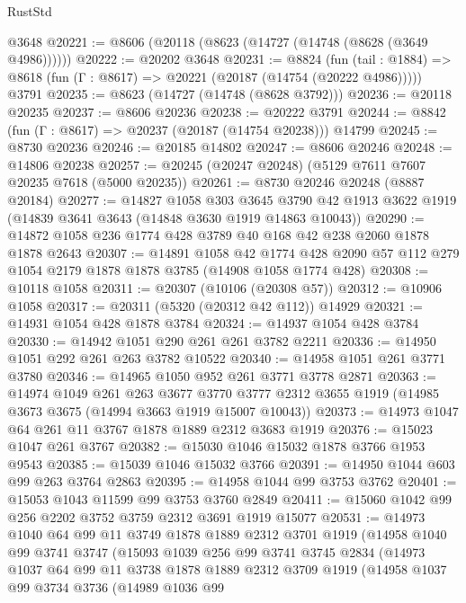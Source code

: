 \begin{lexlean}{RustStd}
\begin{coremodule}
    @3648
@20221 := @8606 (@20118 (@8623 (@14727 (@14748 (@8628 (@3649 @4986))))))
@20222 := @20202 @3648
@20231 := @8824
    (fun (tail : @1884) => @8618 (fun (Γ : @8617) => @20221 (@20187 (@14754 (@20222 @4986)))))
    @3791
@20235 := @8623 (@14727 (@14748 (@8628 @3792)))
@20236 := @20118 @20235
@20237 := @8606 @20236
@20238 := @20222 @3791
@20244 := @8842 (fun (Γ : @8617) => @20237 (@20187 (@14754 @20238))) @14799
@20245 := @8730 @20236
@20246 := @20185 @14802
@20247 := @8606 @20246
@20248 := @14806 @20238
@20257 := @20245 (@20247 @20248) (@5129 @7611 @7607 @20235 @7618 (@5000 @20235))
@20261 := @8730 @20246 @20248 (@8887 @20184)
@20277 := @14827
    @1058
    @303
    @3645
    @3790
    @42
    @1913
    @3622
    @1919
    (@14839 @3641 @3643 (@14848 @3630 @1919 @14863 @10043))
@20290 := @14872 @1058 @236 @1774 @428 @3789 @40 @168 @42 @238 @2060 @1878 @1878 @2643
@20307 := @14891
    @1058
    @42
    @1774
    @428
    @2090
    @57
    @112
    @279
    @1054
    @2179
    @1878
    @1878
    @3785
    (@14908 @1058 @1774 @428)
@20308 := @10118 @1058
@20311 := @20307 (@10106 (@20308 @57))
@20312 := @10906 @1058
@20317 := @20311 (@5320 (@20312 @42 @112)) @14929
@20321 := @14931 @1054 @428 @1878 @3784
@20324 := @14937 @1054 @428 @3784
@20330 := @14942 @1051 @290 @261 @261 @3782 @2211
@20336 := @14950 @1051 @292 @261 @263 @3782 @10522
@20340 := @14958 @1051 @261 @3771 @3780
@20346 := @14965 @1050 @952 @261 @3771 @3778 @2871
@20363 := @14974
    @1049
    @261
    @263
    @3677
    @3770
    @3777
    @2312
    @3655
    @1919
    (@14985 @3673 @3675 (@14994 @3663 @1919 @15007 @10043))
@20373 := @14973 @1047 @64 @261 @11 @3767 @1878 @1889 @2312 @3683 @1919
@20376 := @15023 @1047 @261 @3767
@20382 := @15030 @1046 @15032 @1878 @3766 @1953 @9543
@20385 := @15039 @1046 @15032 @3766
@20391 := @14950 @1044 @603 @99 @263 @3764 @2863
@20395 := @14958 @1044 @99 @3753 @3762
@20401 := @15053 @1043 @11599 @99 @3753 @3760 @2849
@20411 := @15060 @1042 @99 @256 @2202 @3752 @3759 @2312 @3691 @1919 @15077
@20531 := @14973
    @1040
    @64
    @99
    @11
    @3749
    @1878
    @1889
    @2312
    @3701
    @1919
    (@14958
      @1040
      @99
      @3741
      @3747
      (@15093
        @1039
        @256
        @99
        @3741
        @3745
        @2834
        (@14973
          @1037
          @64
          @99
          @11
          @3738
          @1878
          @1889
          @2312
          @3709
          @1919
          (@14958
            @1037
            @99
            @3734
            @3736
            (@14989
              @1036
              @99

\end{coremodule}
\end{lexlean}
